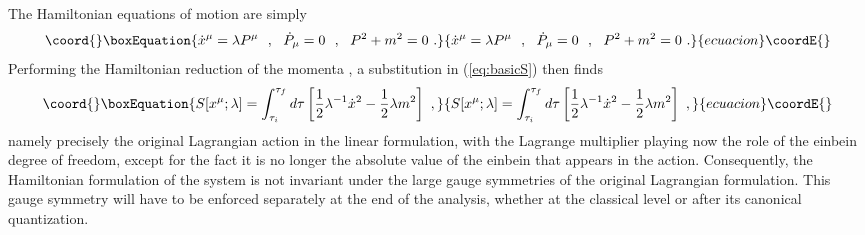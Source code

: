 \documentclass[a4paper,11pt]{article}
\begin{document}
The Hamiltonian equations of motion are simply
\begin{equation}\coord{}\boxEquation{
\dot{x}^\mu=\lambda P^\mu\ \ ,\ \ \dot{P}_\mu=0\ \ ,\ \ P^2+m^2=0\ .
}{
\dot{x}^\mu=\lambda P^\mu\ \ ,\ \ \dot{P}_\mu=0\ \ ,\ \ P^2+m^2=0\ .
}{ecuacion}\coordE{}\end{equation}
Performing the Hamiltonian reduction of the momenta 
\coordHE{}, a substitution in (\ref{eq:basicS})
then finds
\begin{equation}\coord{}\boxEquation{
S[x^\mu;\lambda]=\int_{\tau_i}^{\tau_f}d\tau
\left[\frac{1}{2}\lambda^{-1}\dot{x}^2-\frac{1}{2}\lambda m^2\right]\ ,
}{
S[x^\mu;\lambda]=\int_{\tau_i}^{\tau_f}d\tau
\left[\frac{1}{2}\lambda^{-1}\dot{x}^2-\frac{1}{2}\lambda m^2\right]\ ,
}{ecuacion}\coordE{}\end{equation}
namely precisely the original Lagrangian action in the linear formulation,
with the Lagrange multiplier \myHighlight{$\lambda$}\coordHE{} playing now the role of the einbein
degree of freedom, except for the fact it is no longer the absolute value
of the einbein that appears in the action. Consequently, the Hamiltonian
formulation of the system is not invariant under the large gauge symmetries
of the original Lagrangian formulation. This gauge symmetry will have to be
enforced se\-pa\-ra\-te\-ly at the end of the analysis, whether at the 
classical level or after its canonical quantization.
\end{document}
